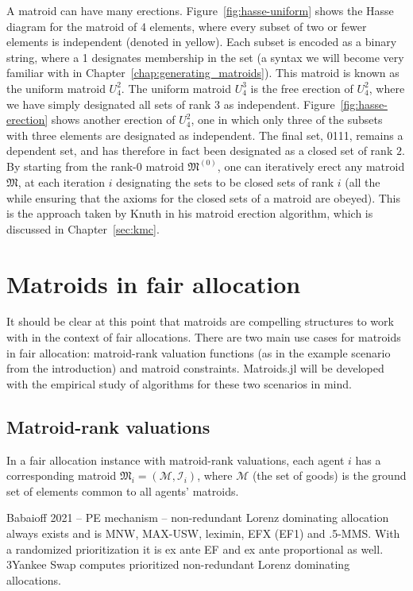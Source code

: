 A matroid can have many erections. Figure~\ref{fig:hasse-uniform} shows the Hasse diagram for the matroid of 4 elements, where every subset of two or fewer elements is independent (denoted in yellow). Each subset is encoded as a binary string, where a 1 designates membership in the set (a syntax we will become very familiar with in Chapter~\ref{chap:generating_matroids}). This matroid is known as the uniform matroid $U_4^2$. The uniform matroid $U_4^3$ is the free erection of $U_4^2$, where we have simply designated all sets of rank 3 as independent. Figure~\ref{fig:hasse-erection} shows another erection of $U_4^2$, one in which only three of the subsets with three elements are designated as independent. The final set, 0111, remains a dependent set, and has therefore in fact been designated as a closed set of rank $2$. By starting from the rank-0 matroid $\mathfrak{M}^{(0)}$, one can iteratively erect any matroid $\mathfrak{M}$, at each iteration $i$ designating the sets to be closed sets of rank $i$ (all the while ensuring that the axioms for the closed sets of a matroid are obeyed). This is the approach taken by Knuth in his matroid erection algorithm, which is discussed in Chapter~\ref{sec:kmc}.



\section{Matroids in fair allocation}
It should be clear at this point that matroids are compelling structures to work with in the context of fair allocations. There are two main use cases for matroids in fair allocation: matroid-rank valuation functions (as in the example scenario from the introduction) and matroid constraints. Matroids.jl will be developed with the empirical study of algorithms for these two scenarios in mind.

\subsection{Matroid-rank valuations}
In a fair allocation instance with matroid-rank valuations, each agent $i$ has a corresponding matroid $\mathfrak{M}_i = (\mathcal{M}, \mathcal{I}_i)$, where $\mathcal{M}$ (the set of goods) is the ground set of elements common to all agents' matroids.

Babaioff 2021 -- PE mechanism -- non-redundant Lorenz dominating allocation always exists and is MNW, MAX-USW, leximin, EFX (EF1) and .5-MMS. With a randomized prioritization it is ex ante EF and ex ante proportional as well. 3Yankee Swap computes prioritized non-redundant Lorenz dominating allocations.


